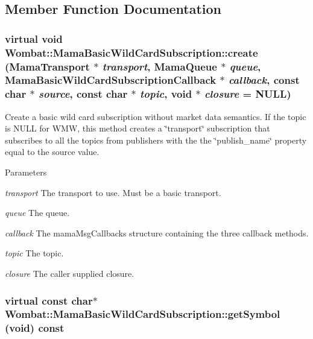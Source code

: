 \subsection{Member Function Documentation}
\hypertarget{classWombat_1_1MamaBasicWildCardSubscription_a47b0951423f36f41995e152a07f688fc}{
\subsubsection[{create}]{\setlength{\rightskip}{0pt plus 5cm}virtual void Wombat::MamaBasicWildCardSubscription::create ({\bf MamaTransport} $\ast$ {\em transport}, \/  {\bf MamaQueue} $\ast$ {\em queue}, \/  {\bf MamaBasicWildCardSubscriptionCallback} $\ast$ {\em callback}, \/  const char $\ast$ {\em source}, \/  const char $\ast$ {\em topic}, \/  void $\ast$ {\em closure} = {\ttfamily NULL})}}
\label{classWombat_1_1MamaBasicWildCardSubscription_a47b0951423f36f41995e152a07f688fc}


Create a basic wild card subscription without market data semantics. If the topic is NULL for WMW, this method creates a \char`\"{}transport\char`\"{} subscription that subscribes to all the topics from publishers with the the \char`\"{}publish\_\-name\char`\"{} property equal to the source value.


\begin{DoxyParams}{Parameters}
\item[{\em transport}]The transport to use. Must be a basic transport. \item[{\em queue}]The queue. \item[{\em callback}]The mamaMsgCallbacks structure containing the three callback methods.\item[{\em topic}]The topic. \item[{\em closure}]The caller supplied closure. \end{DoxyParams}
\hypertarget{classWombat_1_1MamaBasicWildCardSubscription_ae679ef667a9a823214f6bb972035c501}{
\subsubsection[{getSymbol}]{\setlength{\rightskip}{0pt plus 5cm}virtual const char$\ast$ Wombat::MamaBasicWildCardSubscription::getSymbol (void) const}}
\label{classWombat_1_1MamaBasicWildCardSubscription_ae679ef667a9a823214f6bb972035c501}


